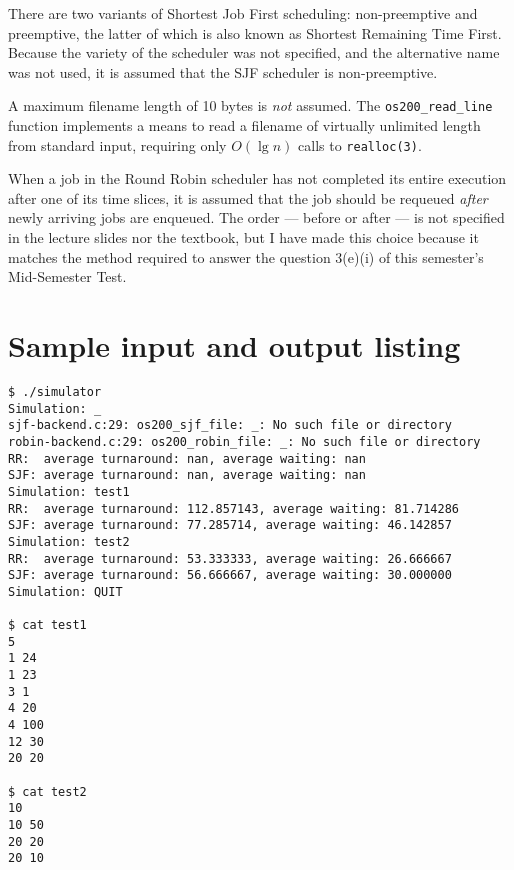 \documentclass[a4paper,12pt,titlepage]{article}
\begin{document}
There are two variants of Shortest Job First scheduling: non-preemptive and
preemptive, the latter of which is also known as Shortest Remaining Time First.
Because the variety of the scheduler was not specified, and the alternative
name was not used, it is assumed that the SJF scheduler is non-preemptive.

A maximum filename length of 10 bytes is \textit{not} assumed. The
\texttt{os200\_read\_line} function implements a means to read a filename of
virtually unlimited length from standard input, requiring only $O(\lg n)$ calls
to \texttt{realloc(3)}.

When a job in the Round Robin scheduler has not completed its entire execution
after one of its time slices, it is assumed that the job should be requeued
\textit{after} newly arriving jobs are enqueued. The order --- before or after
--- is not specified in the lecture slides nor the textbook, but I have made
this choice because it matches the method required to answer the question
3(e)(i) of this semester's Mid-Semester Test.

\newpage

\section{Sample input and output listing}

\begin{lstlisting}
$ ./simulator
Simulation: _
sjf-backend.c:29: os200_sjf_file: _: No such file or directory
robin-backend.c:29: os200_robin_file: _: No such file or directory
RR:  average turnaround: nan, average waiting: nan
SJF: average turnaround: nan, average waiting: nan
Simulation: test1
RR:  average turnaround: 112.857143, average waiting: 81.714286
SJF: average turnaround: 77.285714, average waiting: 46.142857
Simulation: test2
RR:  average turnaround: 53.333333, average waiting: 26.666667
SJF: average turnaround: 56.666667, average waiting: 30.000000
Simulation: QUIT

$ cat test1
5
1 24
1 23
3 1
4 20
4 100
12 30
20 20

$ cat test2
10
10 50
20 20
20 10
\end{lstlisting}
\end{document}
